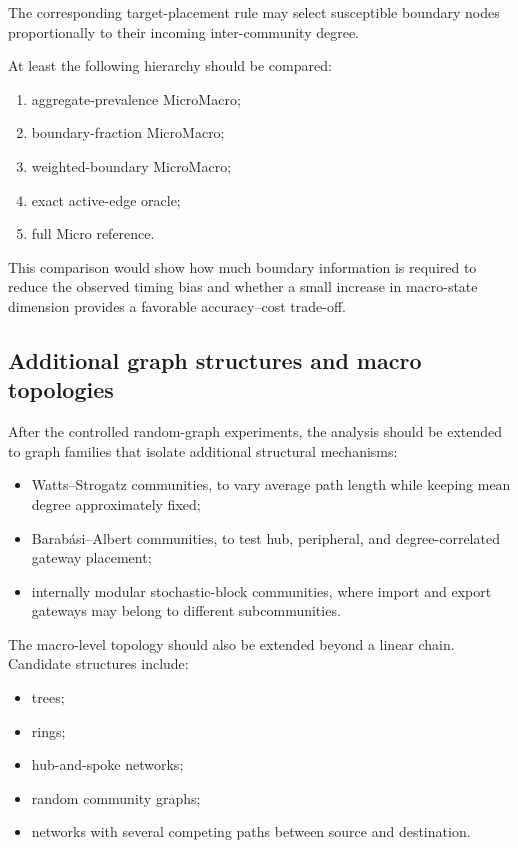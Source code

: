 \documentclass[12pt,a4paper]{article}
\begin{document}
The corresponding target-placement rule may select susceptible boundary nodes proportionally to their incoming inter-community degree.

At least the following hierarchy should be compared:
\begin{enumerate}
    \item aggregate-prevalence MicroMacro;
    \item boundary-fraction MicroMacro;
    \item weighted-boundary MicroMacro;
    \item exact active-edge oracle;
    \item full Micro reference.
\end{enumerate}

This comparison would show how much boundary information is required to reduce the observed timing bias and whether a small increase in macro-state dimension provides a favorable accuracy--cost trade-off.

\subsection{Additional graph structures and macro topologies}

After the controlled random-graph experiments, the analysis should be extended to graph families that isolate additional structural mechanisms:
\begin{itemize}
    \item Watts--Strogatz communities, to vary average path length while keeping mean degree approximately fixed;
    \item Barab\'asi--Albert communities, to test hub, peripheral, and degree-correlated gateway placement;
    \item internally modular stochastic-block communities, where import and export gateways may belong to different subcommunities.
\end{itemize}

The macro-level topology should also be extended beyond a linear chain. Candidate structures include:
\begin{itemize}
    \item trees;
    \item rings;
    \item hub-and-spoke networks;
    \item random community graphs;
    \item networks with several competing paths between source and destination.
\end{itemize}
\end{document}
